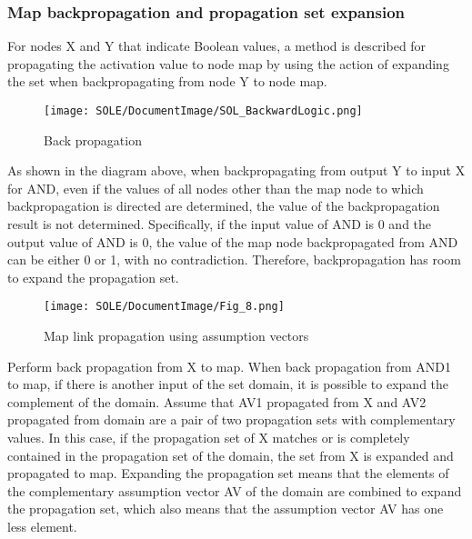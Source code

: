 \documentclass[12pt]{article}
\begin{document}
\subsubsection{Map backpropagation and propagation set
expansion}\label{map-backpropagation-and-propagation-set-expansion}

For nodes X and Y that indicate Boolean values, a method is described
for propagating the activation value to node map by using the action of
expanding the set when backpropagating from node Y to node map.

\begin{figure}[ht]
  \centering
  \texttt{[image: SOLE/DocumentImage/SOL\_BackwardLogic.png]}
  \caption{Back propagation}
  \label{fig:back_propagation}
\end{figure}

As shown in the diagram above, when backpropagating from output Y to
input X for AND, even if the values \hspace{0pt}\hspace{0pt}of all nodes
other than the map node to which backpropagation is directed are
determined, the value of the backpropagation result is not determined.
Specifically, if the input value of AND is 0 and the output value of AND
is 0, the value of the map node backpropagated from AND can be either 0
or 1, with no contradiction. Therefore, backpropagation has room to
expand the propagation set.

\begin{figure}[ht]
  \centering
  \texttt{[image: SOLE/DocumentImage/Fig\_8.png]}
  \caption{Map link propagation using assumption vectors}
  \label{fig:map_link_propagation_using_assumption_vectors}
\end{figure}

Perform back propagation from X to map. When back propagation from AND1
to map, if there is another input of the set domain, it is possible to
expand the complement of the domain. Assume that AV1 propagated from X
and AV2 propagated from domain are a pair of two propagation sets with
complementary values. In this case, if the propagation set of X matches
or is completely contained in the propagation set of the domain, the set
from X is expanded and propagated to map. Expanding the propagation set
means that the elements of the complementary assumption vector AV of the
domain are combined to expand the propagation set, which also means that
the assumption vector AV has one less element.
\end{document}
